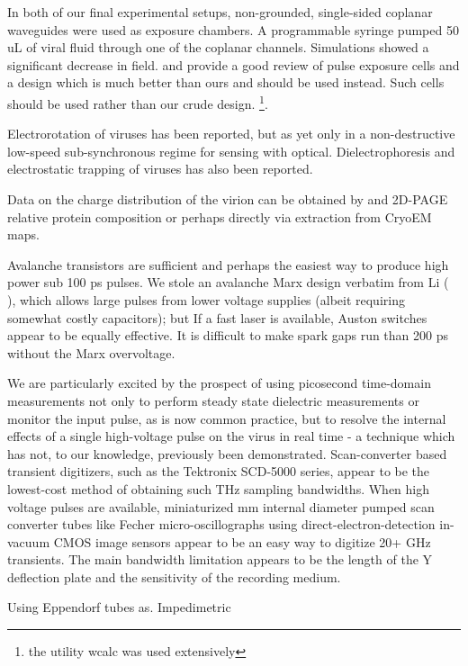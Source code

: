 \documentclass[paper.tex]{subfiles}
\begin{document}
In both of our final experimental setups, non-grounded, single-sided coplanar waveguides were used as exposure chambers. A programmable syringe pumped 50 uL of viral fluid through one of the coplanar channels. Simulations showed a significant decrease in field. \cite{Microchamber2011} and \cite{Characterization2012} provide a good review of pulse exposure cells and a design which is much better than ours and should be used instead. Such cells should be used rather than our crude design. \footnote{the utility wcalc was used extensively}.

Electrorotation of viruses has been reported\cite{Analysis2004}\cite{New1999}\cite{comprehensive2001}, but as yet only in a non-destructive low-speed sub-synchronous regime for sensing with optical. Dielectrophoresis and electrostatic trapping of viruses has also been reported.

Data on the charge distribution of the virion can be obtained by and 2D-PAGE relative protein composition or perhaps directly via extraction from CryoEM maps.

Avalanche transistors are sufficient and perhaps the easiest way to produce high power sub 100 ps pulses. We stole an avalanche Marx design verbatim from Li (\cite{Development2016b} \cite{Design2018c}), which allows large pulses from lower voltage supplies (albeit requiring somewhat costly capacitors); but  If a fast laser is available, Auston switches appear to be equally effective. It is difficult to make spark gaps run than 200 ps without the Marx overvoltage.

We are particularly excited by the prospect of using picosecond time-domain measurements not only to perform steady state dielectric measurements or monitor the input pulse, as is now common practice, but to resolve the internal effects of a single high-voltage pulse on the virus in real time - a technique which has not, to our knowledge, previously been demonstrated. Scan-converter based transient digitizers, such as the Tektronix SCD-5000 series, appear to be the lowest-cost method of obtaining such THz sampling bandwidths. When high voltage pulses are available, miniaturized  mm internal diameter pumped scan converter tubes like Fecher micro-oscillographs using direct-electron-detection in-vacuum CMOS image sensors appear to be an easy way to digitize 20+ GHz transients. The main bandwidth limitation appears to be the length of the Y deflection plate and the sensitivity of the recording medium.

Using Eppendorf tubes as. Impedimetric 
\end{document}
